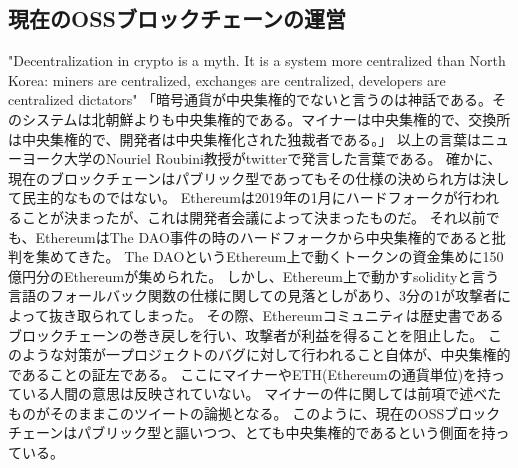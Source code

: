 \subsection{現在のOSSブロックチェーンの運営}
"Decentralization in crypto is a myth. It is a system more centralized than North Korea: miners are centralized, exchanges are centralized, developers are centralized dictators"
「暗号通貨が中央集権的でないと言うのは神話である。そのシステムは北朝鮮よりも中央集権的である。マイナーは中央集権的で、交換所は中央集権的で、開発者は中央集権化された独裁者である。」
以上の言葉はニューヨーク大学のNouriel Roubini教授がtwitterで発言した言葉である。
確かに、現在のブロックチェーンはパブリック型であってもその仕様の決められ方は決して民主的なものではない。
Ethereumは2019年の1月にハードフォークが行われることが決まったが、これは開発者会議によって決まったものだ。
それ以前でも、EthereumはThe DAO事件の時のハードフォークから中央集権的であると批判を集めてきた。
The DAOというEthereum上で動くトークンの資金集めに150億円分のEthereumが集められた。
しかし、Ethereum上で動かすsolidityと言う言語のフォールバック関数の仕様に関しての見落としがあり、3分の1が攻撃者によって抜き取られてしまった。
その際、Ethereumコミュニティは歴史書であるブロックチェーンの巻き戻しを行い、攻撃者が利益を得ることを阻止した。
このような対策が一プロジェクトのバグに対して行われること自体が、中央集権的であることの証左である。
ここにマイナーやETH(Ethereumの通貨単位)を持っている人間の意思は反映されていない。
マイナーの件に関しては前項で述べたものがそのままこのツイートの論拠となる。
このように、現在のOSSブロックチェーンはパブリック型と謳いつつ、とても中央集権的であるという側面を持っている。

